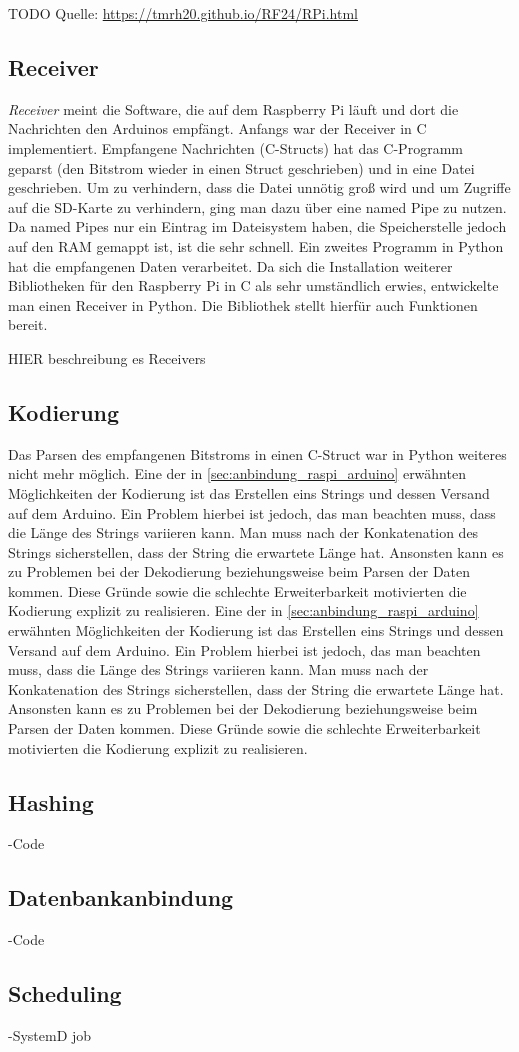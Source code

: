 TODO Quelle: \url{https://tmrh20.github.io/RF24/RPi.html}

\subsection{Receiver}
\textit{Receiver} meint die Software, die auf dem Raspberry Pi läuft und dort die Nachrichten den Arduinos empfängt. Anfangs war der Receiver in C implementiert. Empfangene Nachrichten (C-Structs) hat das C-Programm geparst (den Bitstrom wieder in einen Struct geschrieben) und in eine Datei geschrieben. Um zu verhindern, dass die Datei unnötig groß wird und um Zugriffe auf die SD-Karte zu verhindern, ging man dazu über eine named Pipe zu nutzen. Da named Pipes nur ein Eintrag im Dateisystem haben, die Speicherstelle jedoch auf den RAM gemappt ist, ist die sehr schnell. Ein zweites Programm in Python hat die empfangenen Daten verarbeitet. 
Da sich die Installation weiterer Bibliotheken für den Raspberry Pi in C als sehr umständlich erwies, entwickelte man einen Receiver in Python. Die Bibliothek stellt hierfür auch Funktionen bereit. 

HIER beschreibung es Receivers
 

\subsection{Kodierung}
Das Parsen des empfangenen Bitstroms in einen C-Struct war in Python weiteres nicht mehr möglich. 
Eine der in \ref{sec:anbindung_raspi_arduino} erwähnten Möglichkeiten der Kodierung ist das Erstellen eins Strings und dessen Versand auf dem Arduino. Ein Problem hierbei ist jedoch, das man beachten muss, dass die Länge des Strings variieren kann. Man muss nach der Konkatenation des Strings sicherstellen, dass der String die erwartete Länge hat. Ansonsten kann es zu Problemen bei der Dekodierung beziehungsweise beim Parsen der Daten kommen. Diese Gründe sowie die schlechte Erweiterbarkeit motivierten die Kodierung explizit zu realisieren. 
Eine der in \ref{sec:anbindung_raspi_arduino} erwähnten Möglichkeiten der Kodierung ist das Erstellen eins Strings und dessen Versand auf dem Arduino. Ein Problem hierbei ist jedoch, das man beachten muss, dass die Länge des Strings variieren kann. Man muss nach der Konkatenation des Strings sicherstellen, dass der String die erwartete Länge hat. Ansonsten kann es zu Problemen bei der Dekodierung beziehungsweise beim Parsen der Daten kommen. Diese Gründe sowie die schlechte Erweiterbarkeit motivierten die Kodierung explizit zu realisieren. 
\subsection{Hashing}
-Code
\subsection{Datenbankanbindung}
-Code
\subsection{Scheduling}
-SystemD job